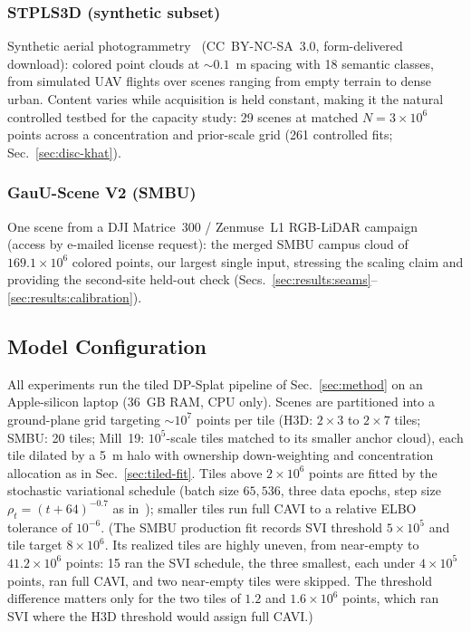 \subsubsection{STPLS3D (synthetic subset)}
Synthetic aerial photogrammetry~\cite{chen2022stpls3d} (CC~BY-NC-SA~3.0,
form-delivered download): colored point clouds at ${\sim}0.1$~m spacing with 18
semantic classes, from simulated UAV flights over scenes ranging from
empty terrain to dense urban. Content varies while acquisition is held
constant, making it the natural controlled testbed for the capacity
study: 29
scenes at matched $N=3\times10^{6}$ points across a concentration and
prior-scale grid (261 controlled fits; Sec.~\ref{sec:disc-khat}).

\subsubsection{GauU-Scene V2 (SMBU)}
One scene from a DJI Matrice~300 / Zenmuse~L1 RGB-LiDAR
campaign~\cite{xiong2024gauuscene} (access by e-mailed license request): the
merged SMBU campus cloud of $169.1\times10^{6}$ colored points, our
largest single input, stressing the scaling claim and providing the
second-site held-out check
(Secs.~\ref{sec:results:seams}--\ref{sec:results:calibration}).

\subsection{Model Configuration}
\label{sec:setup:config}

 All experiments run the tiled DP-Splat pipeline of
Sec.~\ref{sec:method} on an Apple-silicon laptop (36~GB RAM, CPU
only). Scenes are partitioned into a ground-plane grid
targeting ${\sim}10^{7}$ points per tile (H3D: $2\times3$ to $2\times7$
tiles; SMBU: 20 tiles; Mill~19: $10^{5}$-scale tiles matched to its
smaller anchor cloud), each tile dilated by a 5~m halo with ownership
down-weighting and concentration allocation as in
Sec.~\ref{sec:tiled-fit}. Tiles above $2\times10^{6}$ points are fitted
by the stochastic variational schedule (batch size $65{,}536$, three
data epochs, step size $\rho_t=(t+64)^{-0.7}$ as
in~\cite{dong2026dpsplat}); smaller tiles run full CAVI to a relative ELBO tolerance
of $10^{-6}$. (The SMBU production fit records SVI threshold
$5\times10^{5}$ and tile target $8\times10^{6}$. Its realized tiles
are highly uneven, from near-empty to $41.2\times10^{6}$ points: 15
ran the SVI schedule, the three smallest, each under $4\times10^{5}$
points, ran full CAVI, and two near-empty tiles were skipped. The
threshold difference matters only for the two tiles of $1.2$ and
$1.6\times10^{6}$ points, which ran SVI where the H3D threshold would
assign full CAVI.)

